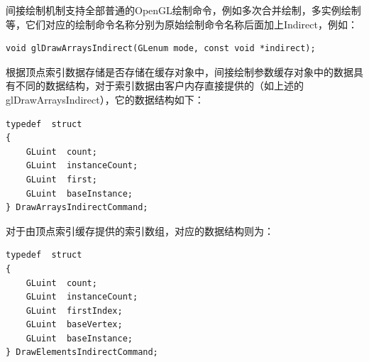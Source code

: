 间接绘制机制支持全部普通的OpenGL绘制命令，例如多次合并绘制，多实例绘制等，它们对应的绘制命令名称分别为原始绘制命令名称后面加上Indirect，例如：

\begin{lstlisting}
void glDrawArraysIndirect​(GLenum mode​, const void *indirect​);
\end{lstlisting}

根据顶点索引数据存储是否存储在缓存对象中，间接绘制参数缓存对象中的数据具有不同的数据结构，对于索引数据由客户内存直接提供的（如上述的glDrawArraysIndirect），它的数据结构如下：

\begin{lstlisting}
typedef  struct 
{
   	GLuint  count;
   	GLuint  instanceCount;
   	GLuint  first;
   	GLuint  baseInstance;
} DrawArraysIndirectCommand;
\end{lstlisting}

对于由顶点索引缓存提供的索引数组，对应的数据结构则为：

\begin{lstlisting}
typedef  struct 
{
    GLuint  count;
    GLuint  instanceCount;
    GLuint  firstIndex;
    GLuint  baseVertex;
    GLuint  baseInstance;
} DrawElementsIndirectCommand;
\end{lstlisting}


